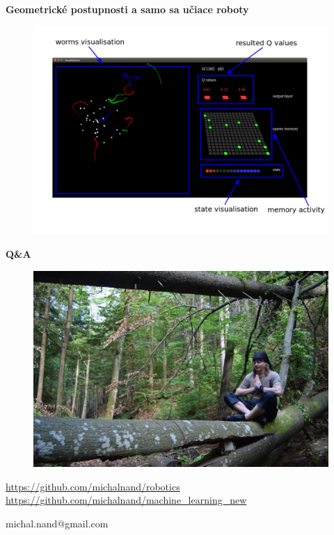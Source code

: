 \documentclass[xcolor=dvipsnames]{beamer}
\begin{document}
\begin{frame}{\bf Geometrické postupnosti a samo sa učiace roboty}

\centering
\begin{figure}[C]
   \includegraphics[scale=0.27]{../pictures/sdm_demo_desc.png}
\end{figure}

\end{frame}

\begin{frame}{\bf Q\&A}

\begin{figure}[ht]
\begin{center}
\begin{minipage}{0.8\linewidth}
\begin{center}
 \includegraphics[width=1.0\textwidth]{../pictures/me.jpg}
\end{center}
\end{minipage}
\end{center}
\end{figure}

\url{https://github.com/michalnand/robotics}
\url{https://github.com/michalnand/machine\_learning\_new}

\centerline{michal.nand@gmail.com}

\end{frame}
\end{document}
